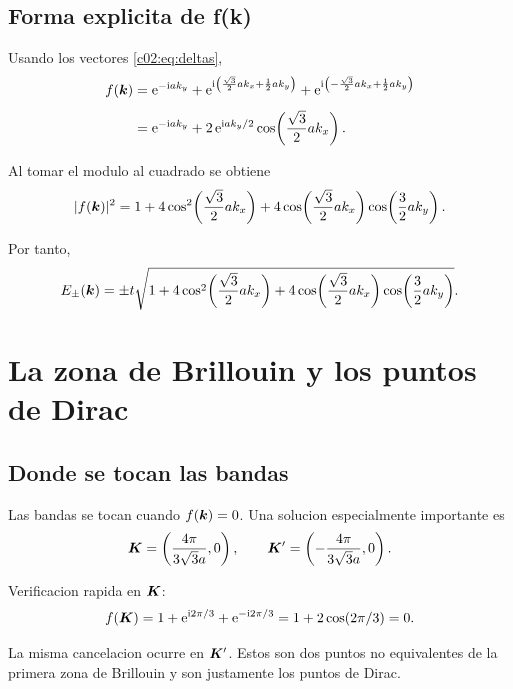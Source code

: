\subsection{Forma explicita de f(k)}

Usando los vectores \eqref{c02:eq:deltas},
\begin{align}
f(\bm{k})
&=
\mathrm{e}^{-\mathrm{i} a k_y}
+ \mathrm{e}^{\mathrm{i}\left(\frac{\sqrt{3}}{2}a k_x+\frac{1}{2}a k_y\right)}
+ \mathrm{e}^{\mathrm{i}\left(-\frac{\sqrt{3}}{2}a k_x+\frac{1}{2}a k_y\right)}
\nonumber\\[4pt]
&=
\mathrm{e}^{-\mathrm{i} a k_y}
+ 2\,\mathrm{e}^{\mathrm{i} a k_y/2}\cos\!\left(\frac{\sqrt{3}}{2}a k_x\right).
\label{c02:eq:fk-explicit}
\end{align}

Al tomar el modulo al cuadrado se obtiene
\begin{equation}
|f(\bm{k})|^2
=
1
+4\cos^2\!\left(\frac{\sqrt{3}}{2}a k_x\right)
+4\cos\!\left(\frac{\sqrt{3}}{2}a k_x\right)\cos\!\left(\frac{3}{2}a k_y\right).
\label{c02:eq:fk-mod}
\end{equation}

Por tanto,
\begin{equation}
E_\pm(\bm{k})=
\pm t
\sqrt{
1
+4\cos^2\!\left(\frac{\sqrt{3}}{2}a k_x\right)
+4\cos\!\left(\frac{\sqrt{3}}{2}a k_x\right)\cos\!\left(\frac{3}{2}a k_y\right)
}.
\label{c02:eq:graphene-dispersion}
\end{equation}

\section{La zona de Brillouin y los puntos de Dirac}

\subsection{Donde se tocan las bandas}

Las bandas se tocan cuando \(f(\bm{k})=0\). Una solucion especialmente importante es
\begin{equation}
\bm{K}=\left(\frac{4\pi}{3\sqrt{3}a},0\right),
\qquad
\bm{K}'=\left(-\frac{4\pi}{3\sqrt{3}a},0\right).
\label{c02:eq:KKp}
\end{equation}

Verificacion rapida en \(\bm{K}\):
\begin{equation}
f(\bm{K})
=
1+\mathrm{e}^{\mathrm{i} 2\pi/3}+\mathrm{e}^{-\mathrm{i} 2\pi/3}
=1+2\cos(2\pi/3)=0.
\end{equation}

La misma cancelacion ocurre en \(\bm{K}'\). Estos son dos puntos no equivalentes de la primera zona de Brillouin y son justamente los puntos de Dirac.

